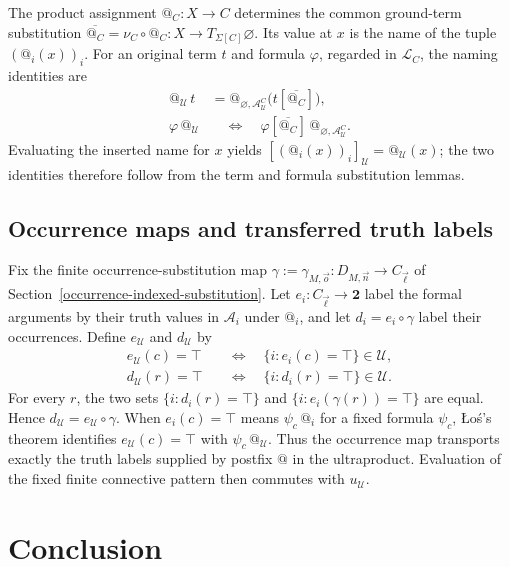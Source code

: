 \documentclass[11pt]{article}
\makeatletter
\newcommand{\atsign}{\mathord{@}}
\theoremstyle{definition}
\makeatother
\begin{document}
The product assignment \(\atsign_C:X\to C\) determines the common
ground-term substitution
\(\overline{\atsign_C}=\nu_C\circ\atsign_C:
X\to T_{\Sigma[C]}\varnothing\).
Its value at \(x\) is the name of the tuple
\((\atsign_i(x))_i\).
For an original term \(t\) and formula \(\varphi\), regarded in
\(\mathcal L_C\), the naming identities are
\[
\begin{aligned}
\atsign_{\mathcal U}\,t
&=\atsign_{\varnothing,\mathcal A_{\mathcal U}^C}
       \bigl(t[\overline{\atsign_C}]\bigr),\\
\varphi\,\atsign_{\mathcal U}
&\quad\Longleftrightarrow\quad
\varphi[\overline{\atsign_C}]\,
       \atsign_{\varnothing,\mathcal A_{\mathcal U}^C}.
\end{aligned}
\]
Evaluating the inserted name for \(x\) yields
\([(\atsign_i(x))_i]_{\mathcal U}=\atsign_{\mathcal U}(x)\);
the two identities therefore follow from the term and formula
substitution lemmas.

\subsection{Occurrence maps and transferred truth labels}

Fix the finite occurrence-substitution map
\(\gamma:=\gamma_{M,\vec o}:D_{M,\vec n}\to C_{\vec\ell}\) of
Section~\ref{occurrence-indexed-substitution}. Let
\(e_i:C_{\vec\ell}\to\mathbf2\) label the formal arguments by
their truth values in \(\mathcal A_i\) under \(\atsign_i\), and let
\(d_i=e_i\circ\gamma\) label their occurrences.
Define \(e_{\mathcal U}\) and \(d_{\mathcal U}\) by
\[
\begin{aligned}
e_{\mathcal U}(c)=\top
&\quad\Longleftrightarrow\quad
\{i:e_i(c)=\top\}\in\mathcal U,\\
d_{\mathcal U}(r)=\top
&\quad\Longleftrightarrow\quad
\{i:d_i(r)=\top\}\in\mathcal U.
\end{aligned}
\]
For every \(r\), the two sets
\(\{i:d_i(r)=\top\}\) and
\(\{i:e_i(\gamma(r))=\top\}\) are equal. Hence
\(d_{\mathcal U}=e_{\mathcal U}\circ\gamma\).
When \(e_i(c)=\top\) means
\(\psi_c\,\atsign_i\) for a fixed formula \(\psi_c\),
\L{}o\'s's theorem identifies
\(e_{\mathcal U}(c)=\top\) with
\(\psi_c\,\atsign_{\mathcal U}\).
Thus the occurrence map transports exactly the truth labels supplied
by postfix \(\atsign\) in the ultraproduct. Evaluation of the fixed
finite connective pattern then commutes with
\(u_{\mathcal U}\).


\section{Conclusion}\label{conclusion}
\end{document}
